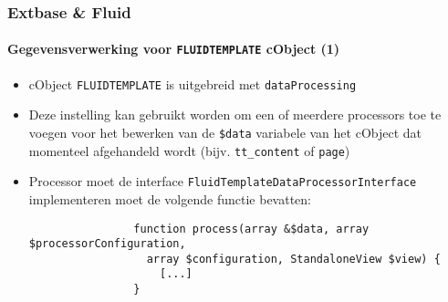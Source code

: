 \begin{frame}[fragile]
	\frametitle{Extbase \& Fluid}
	\framesubtitle{Gegevensverwerking voor \texttt{FLUIDTEMPLATE} cObject (1)}

	\lstset{basicstyle=\smaller\ttfamily}

	\begin{itemize}

		\item cObject \texttt{FLUIDTEMPLATE} is uitgebreid met \texttt{dataProcessing}

		\item Deze instelling kan gebruikt worden om een of meerdere processors toe te voegen
			voor het bewerken van de \texttt{\$data} variabele van het cObject dat momenteel afgehandeld wordt\newline
			(bijv. \texttt{tt\_content} of \texttt{page})

		\item Processor moet de interface \texttt{FluidTemplateDataProcessorInterface} implementeren moet de volgende
			functie bevatten:

			\begin{lstlisting}
				function process(array &$data, array $processorConfiguration,
				  array $configuration, StandaloneView $view) {
				    [...]
				}
			\end{lstlisting}

	\end{itemize}

\end{frame}


